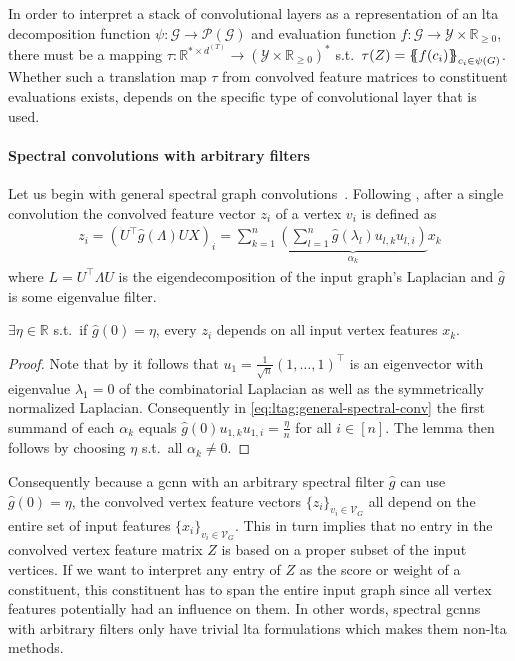In order to interpret a stack of convolutional layers as a representation of an \ac{lta} decomposition function $\psi: \mathcal{G} \to \mathcal{P}(\mathcal{G})$ and evaluation function $f: \mathcal{G} \to \mathcal{Y} \times \mathbb{R}_{\geq 0}$, there must be a mapping $\tau: \mathbb{R}^{* \times d^{(T)}} \to {(\mathcal{Y} \times \mathbb{R}_{\geq 0})}^{*}$ s.t.\ $\tau(Z) = {\ldblbrace f(c_i) \rdblbrace}_{c_i \in \psi(G)}$.
Whether such a translation map $\tau$ from convolved feature matrices to constituent evaluations exists, depends on the specific type of convolutional layer that is used.

\paragraph{Spectral convolutions with arbitrary filters}
Let us begin with general spectral graph convolutions~\cite{Bruna2013}\cite{Henaff2015}.
Following , after a single convolution the convolved feature vector $z_i$ of a vertex $v_i$ is defined as
\begin{align}\label{eq:ltag:general-spectral-conv}
	z_i = {\left( U^{\top} \hat{g}(\Lambda) U X \right)}_i = \sum_{k=1}^n \underbrace{\left( \sum_{l=1}^n \hat{g}(\lambda_l) u_{l,k} u_{l,i} \right)}_{\alpha_k} x_k
\end{align}
where $L = U^{\top} \Lambda U$ is the eigendecomposition of the input graph's Laplacian and $\hat{g}$ is some eigenvalue filter.
\begin{lem}\label{lem:ltag:general-spectral-conv-nonlocality}
	$\exists \eta \in \mathbb{R}$ s.t.\ if $\hat{g}(0) = \eta$, every $z_i$ depends on all input vertex features $x_k$.
\end{lem}
\begin{proof}
	Note that by  it follows that $u_1 = \frac{1}{\sqrt{n}}{(1, \dots, 1)}^{\top}$ is an eigenvector with eigenvalue $\lambda_1 = 0$ of the combinatorial Laplacian as well as the symmetrically normalized Laplacian.
	Consequently in \cref{eq:ltag:general-spectral-conv} the first summand of each $\alpha_k$ equals $\hat{g}(0) u_{1,k} u_{1,i} = \frac{\eta}{n}$ for all $i \in [n]$.
	The lemma then follows by choosing $\eta$ s.t.\ all $\alpha_k \neq 0$.
\end{proof}
Consequently because a \ac{gcnn} with an arbitrary spectral filter $\hat{g}$ can use $\hat{g}(0) = \eta$, the convolved vertex feature vectors ${\{ z_i \}}_{v_i \in \mathcal{V}_G}$ all depend on the entire set of input features ${\{ x_i \}}_{v_i \in \mathcal{V}_G}$.
This in turn implies that no entry in the convolved vertex feature matrix $Z$ is based on a proper subset of the input vertices.
If we want to interpret any entry of $Z$ as the score or weight of a constituent, this constituent has to span the entire input graph since all vertex features potentially had an influence on them.
In other words, spectral \acp{gcnn} with arbitrary filters only have trivial \ac{lta} formulations which makes them non-\acs{lta} methods.

